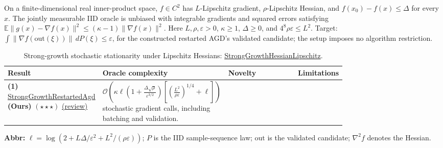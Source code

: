 \begin{table}[tp]
\centering
\caption{Strong-growth stochastic stationarity under Lipschitz Hessians: \href{https://github.com/k3nfalt/longtails/blob/main/LongTails/Setups/StrongGrowthHessianLipschitz.lean}{StrongGrowthHessianLipschitz}.}\label{tab:StrongGrowthHessianLipschitz}
\parbox{\linewidth}{\footnotesize On a finite-dimensional real inner-product space, $f\in C^2$ has $L$-Lipschitz gradient, $\rho$-Lipschitz Hessian, and $f(x_0)-f(x)\le\Delta$ for every $x$. The jointly measurable IID oracle is unbiased with integrable gradients and squared errors satisfying $\mathbb E\|g(x)-\nabla f(x)\|^2\le(\kappa-1)\|\nabla f(x)\|^2$. Here $L,\rho,\varepsilon>0$, $\kappa\ge1$, $\Delta\ge0$, and $4^8\rho\varepsilon\le L^2$. Target: $\int\|\nabla f(\mathrm{out}(\xi))\|\,dP(\xi)\le\varepsilon$, for the constructed restarted AGD's validated candidate; the setup imposes no algorithm restriction.}\par\smallskip
\begin{threeparttable}
\footnotesize
\setlength{\tabcolsep}{4pt}\renewcommand{\arraystretch}{1.25}
\begin{tabularx}{\linewidth}{@{}>{\raggedright\arraybackslash}p{0.20\linewidth}>{\raggedright\arraybackslash}p{0.32\linewidth}>{\raggedright\arraybackslash}p{0.25\linewidth}>{\raggedright\arraybackslash}X@{}}
\toprule
\textbf{Result} & \textbf{Oracle complexity} & \textbf{Novelty} & \textbf{Limitations} \\
\midrule
\textbf{(1)} \href{https://github.com/k3nfalt/longtails/blob/main/LongTails/Theorems/StrongGrowthRestartedAgd.lean}{Strong\allowbreak Growth\allowbreak Restarted\allowbreak Agd} \textbf{(Ours)} $(\star\star\star)$ \href{https://github.com/k3nfalt/longtails/blob/main/scripts/reviews/StrongGrowthRestartedAgd.md}{(review)} & $\mathcal{O}\!\left(\kappa\ell\left(1+\frac{\Delta\sqrt\rho}{\varepsilon^{3/2}}\right)\left[\left(\frac{L^2}{\rho\varepsilon}\right)^{1/4}+\ell\right]\right)$ stochastic gradient calls, including batching and validation. & & \\
\bottomrule
\end{tabularx}
\begin{tablenotes}[flushleft]\footnotesize
\item[] \textbf{Abbr:} $\ell=\log(2+L\Delta/\varepsilon^2+L^2/(\rho\varepsilon))$; $P$ is the IID sample-sequence law; $\mathrm{out}$ is the validated candidate; $\nabla^2 f$ denotes the Hessian.
\end{tablenotes}
\end{threeparttable}
\end{table}
\clearpage
